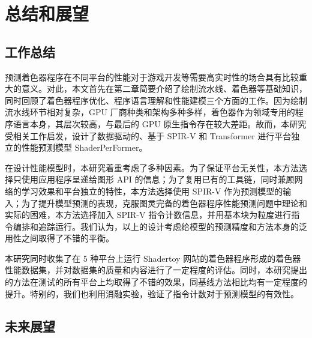 \chapter{总结和展望}

\section{工作总结}

预测着色器程序在不同平台的性能对于游戏开发等需要高实时性的场合具有比较重大的意义。对此，本文首先在第二章简要介绍了绘制流水线、着色器等基础知识，同时回顾了着色器程序优化、程序语言理解和性能建模三个方面的工作。因为绘制流水线环节相对复杂，GPU 厂商种类和架构多种多样，着色器作为领域专用的程序语言本身，其层次较高，与最后的 GPU 原生指令存在较大差距。故而，本研究受相关工作启发，设计了数据驱动的、基于 SPIR-V 和 Transformer 进行平台独立的性能预测模型 ShaderPerFormer。

在设计性能模型时，本研究着重考虑了多种因素。为了保证平台无关性，本方法选择只使用应用程序呈递给图形 API 的信息；为了复用已有的工具链，同时兼顾网络的学习效果和平台独立的特性，本方法选择使用 SPIR-V 作为预测模型的输入；为了提升模型预测的表现，克服图灵完备的着色器程序性能预测问题中理论和实际的困难，本方法选择加入 SPIR-V 指令计数信息，并用基本块为粒度进行指令编排和追踪运行。我们认为，以上的设计考虑给模型的预测精度和方法本身的泛用性之间取得了不错的平衡。

本研究同时收集了在 5 种平台上运行 Shadertoy 网站的着色器程序形成的着色器性能数据集，并对数据集的质量和内容进行了一定程度的评估。同时，本研究提出的方法在测试的所有平台上均取得了不错的效果，同基线方法相比均有一定程度的提升。特别的，我们也利用消融实验，验证了指令计数对于预测模型的有效性。

\section{未来展望}


